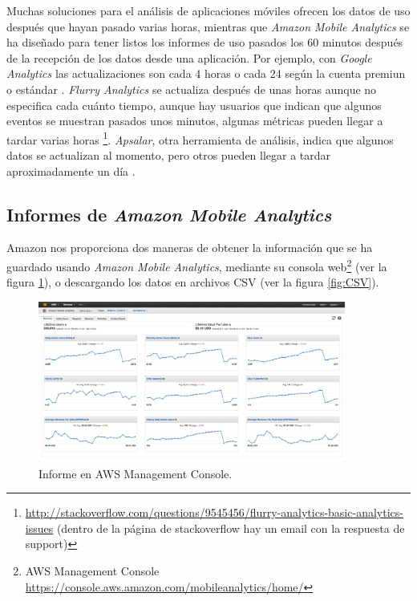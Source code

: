 \documentclass{article}
\begin{document}
	Muchas soluciones para el análisis de aplicaciones móviles ofrecen los datos de uso después que hayan pasado varias horas, mientras que \emph{Amazon Mobile Analytics} se ha diseñado para tener listos los informes de uso pasados los 60 minutos después de la recepción de los datos desde una aplicación.
	Por ejemplo, con \emph{Google Analytics} las actualizaciones son cada 4 horas o cada 24 según la cuenta premiun o estándar \cite{GoogleAnalytics}. \emph{Flurry Analytics} se actualiza después de unas horas aunque no especifica cada cuánto tiempo\cite{FlurryAnalytics}, aunque hay usuarios que indican que algunos eventos se muestran pasados unos minutos, algunas métricas pueden llegar a tardar varias horas \footnote{\url{http://stackoverflow.com/questions/9545456/flurry-analytics-basic-analytics-issues} (dentro de la página de stackoverflow hay un email con la respuesta de support)}. \emph{Apsalar}, otra herramienta de análisis, indica que algunos datos se actualizan al momento, pero otros pueden llegar a tardar aproximadamente un día \cite{Apsalar}.

\subsection{Informes de \emph{Amazon Mobile Analytics}}

	Amazon nos proporciona dos maneras de obtener la información que se ha guardado usando \emph{Amazon Mobile Analytics}, mediante su consola web\footnote{AWS Management Console \url{https://console.aws.amazon.com/mobileanalytics/home/}} (ver la figura \ref{fig:Overview}), o descargando los datos en archivos CSV (ver la figura \ref{fig:CSV}).

\begin{figure}[h]
  \centering
    \includegraphics[width=0.9\textwidth]{img/001_Overview.png}
  \caption{Informe en AWS  Management Console.}
  \label{fig:Overview}
\end{figure}
\end{document}
